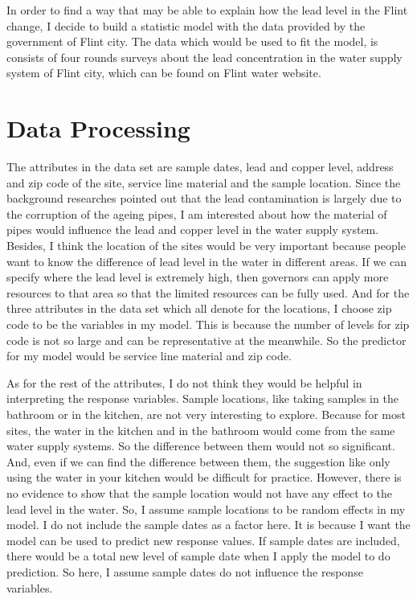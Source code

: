 \documentclass[letterpaper,12pt]{article}
\newcommand{\sihao}{\fontsize{14pt}{\baselineskip}\selectfont}       %
\begin{document}
In order to find a way that may be able to explain how the lead level in the Flint change, I decide to build a statistic model with the data provided by the government of Flint city. The data which would be used to fit the model, is consists of four rounds surveys about the lead concentration in the water supply system of Flint city, which can be found on Flint water website.

\section*{\sihao Data Processing}
The attributes in the data set are sample dates, lead and copper level, address and zip code of the site, service line material and the sample location. Since the background researches pointed out that the lead contamination is largely due to the corruption of the ageing pipes, I am interested about how the material of pipes would influence the lead and copper level in the water supply system. Besides, I think the location of the sites would be very important because people want to know the difference of lead level in the water in different areas. If we can specify where the lead level is extremely high, then governors can apply more resources to that area so that the limited resources can be fully used. And for the three attributes in the data set which all denote for the locations, I choose zip code to be the variables in my model. This is because the number of levels for zip code is not so large and can be representative at the meanwhile. So the predictor for my model would be service line material and zip code. 

As for the rest of the attributes, I do not think they would be helpful in interpreting the response variables. Sample locations, like taking samples in the bathroom or in the kitchen, are not very interesting to explore. Because for most sites, the water in the kitchen and in the bathroom would come from the same water supply systems. So the difference between them would not so significant. And, even if we can find the difference between them, the suggestion like only using the water in your kitchen would be difficult for practice. However, there is no evidence to show that the sample location would not have any effect to the lead level in the water. So, I assume sample locations to be random effects in my model. I do not include the sample dates as a factor here. It is because I want the model can be used to predict new response values. If sample dates are included, there would be a total new level of sample date when I apply the model to do prediction. So here, I assume sample dates do not influence the response variables.
\end{document}
